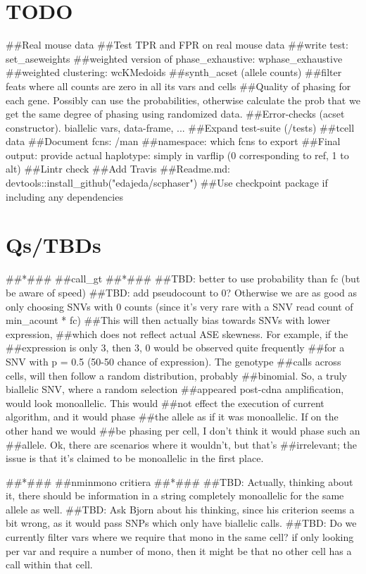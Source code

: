 

\section{TODO}
##Real mouse data
##Test TPR and FPR on real mouse data
##write test: set_aseweights
##weighted version of phase_exhaustive: wphase_exhaustive
##weighted clustering: wcKMedoids
##synth_acset (allele counts)
##filter feats where all counts are zero in all its vars and cells
##Quality of phasing for each gene. Possibly can use the
probabilities, otherwise calculate the prob that we get the same
degree of phasing using randomized data.
##Error-checks (acset constructor). biallelic vars, data-frame, ...
##Expand test-suite (/tests)
##tcell data
##Document fcns: /man
##namespace: which fcns to export
##Final output: provide actual haplotype: simply in varflip (0 corresponding to ref, 1 to alt)
##Lintr check
##Add Travis
##Readme.md: devtools::install_github("edajeda/scphaser")
##Use checkpoint package if including any dependencies

\section{Qs/TBDs}

##*###
##call_gt
##*###
##TBD: better to use probability than fc (but be aware of speed)
##TBD: add pseudocount to 0? Otherwise we are as good as only choosing SNVs with 0 counts (since it's very rare with a SNV read count of min_acount * fc)
##This will then actually bias towards SNVs with lower expression,
##which does not reflect actual ASE skewness. For example, if the
##expression is only 3, then {3, 0} would be observed quite frequently
##for a SNV with p = 0.5 (50-50 chance of expression). The genotype
##calls across cells, will then follow a random distribution, probably
##binomial. So, a truly biallelic SNV, where a random selection
##appeared post-cdna amplification, would look monoallelic. This would
##not effect the execution of current algorithm, and it would phase
##the allele as if it was monoallelic. If on the other hand we would
##be phasing per cell, I don't think it would phase such an
##allele. Ok, there are scenarios where it wouldn't, but that's
##irrelevant; the issue is that it's claimed to be monoallelic in the first place.

##*###
##nminmono critiera
##*###
##TBD: Actually, thinking about it, there should be information in a string completely monoallelic for the same allele as well.
##TBD: Ask Bjorn about his thinking, since his criterion seems a bit wrong, as it would pass SNPs which only have biallelic calls.
##TBD: Do we currently filter vars where we require that mono in the
same cell? if only looking per var and require a number of mono, then
it might be that no other cell has a call within that cell.


